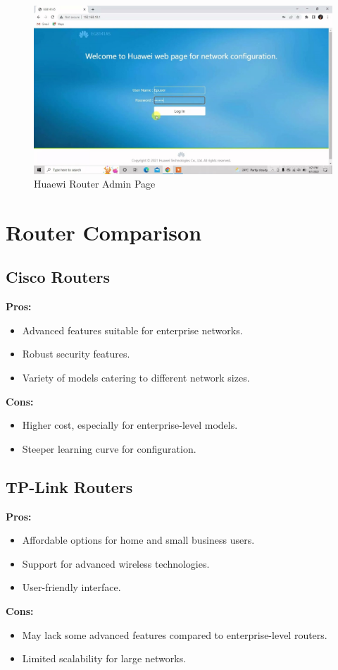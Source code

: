 \documentclass[11pt]{article}
\begin{document}
\begin{figure}[H]
  \centering
  \includegraphics[width=.95\textwidth]{huawei router admin page/huawei router admin page_2.jpg}
  \caption{Huaewi Router Admin Page}
\end{figure}

\section{Router Comparison}

\subsection{Cisco Routers}
\textbf{Pros:}
\begin{itemize}
  \item Advanced features suitable for enterprise networks.
  \item Robust security features.
  \item Variety of models catering to different network sizes.
\end{itemize}
\textbf{Cons:}
\begin{itemize}
  \item Higher cost, especially for enterprise-level models.
  \item Steeper learning curve for configuration.
\end{itemize}

\subsection{TP-Link Routers}
\textbf{Pros:}
\begin{itemize}
  \item Affordable options for home and small business users.
  \item Support for advanced wireless technologies.
  \item User-friendly interface.
\end{itemize}
\textbf{Cons:}
\begin{itemize}
  \item May lack some advanced features compared to enterprise-level routers.
  \item Limited scalability for large networks.
\end{itemize}
\end{document}
